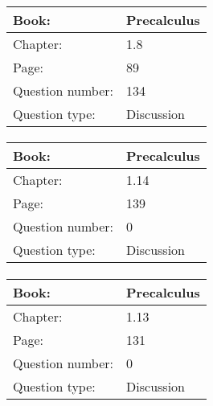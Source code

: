 \documentclass{article}
\begin{document}
            \paragraph{}
            \begin{tabularx}{1\textwidth}{
                    p{}
                    p{}
                }
                \toprule
                Book: & Precalculus
                \\
                \midrule
                Chapter: & 1.8
                \\
                \midrule
                Page: & 89
                \\
                \midrule
                Question number: & 134
                \\
                \midrule
                Question type: & Discussion
                \\
                \bottomrule
            \end{tabularx}
            
            \paragraph{}
            \begin{tabularx}{1\textwidth}{
                    p{}
                    p{}
                }
                \toprule
                Book: & Precalculus
                \\
                \midrule
                Chapter: & 1.14
                \\
                \midrule
                Page: & 139
                \\
                \midrule
                Question number: & 0
                \\
                \midrule
                Question type: & Discussion
                \\
                \bottomrule
            \end{tabularx}
            
            \paragraph{}
            \begin{tabularx}{1\textwidth}{
                    p{}
                    p{}
                }
                \toprule
                Book: & Precalculus
                \\
                \midrule
                Chapter: & 1.13
                \\
                \midrule
                Page: & 131
                \\
                \midrule
                Question number: & 0
                \\
                \midrule
                Question type: & Discussion
                \\
                \bottomrule
            \end{tabularx}
            
\end{document}
